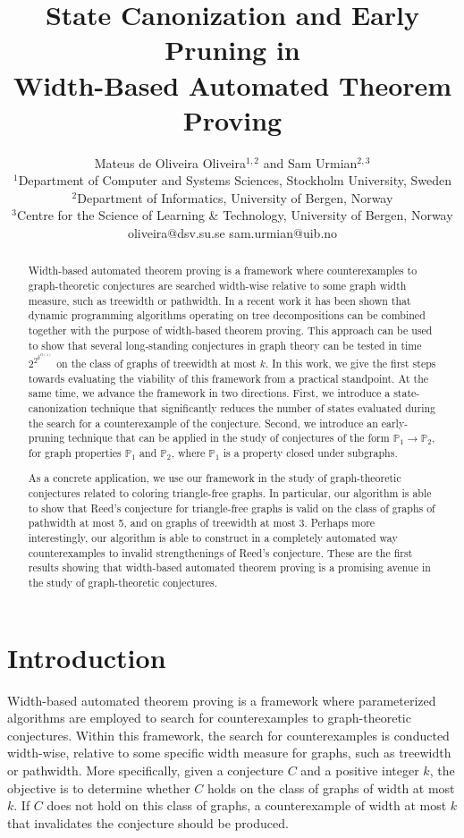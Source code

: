 \documentclass[11pt,a4paper]{article}
\title{State Canonization and Early Pruning in\\Width-Based Automated Theorem Proving}
\author{Mateus de Oliveira Oliveira$^{1,2}$ and Sam Urmian$^{2,3}$ \\
$^1$Department of Computer and Systems Sciences, Stockholm University, Sweden \\
$^2$Department of Informatics, University of Bergen, Norway\\
$^3$Centre for the Science of Learning \& Technology, University of Bergen, Norway\\
oliveira@dsv.su.se \hspace{0.5cm} sam.urmian@uib.no}
\newcommand{\graphproperty}{\mathbb{P}}
\begin{document}
\maketitle


\begin{abstract}
Width-based automated theorem proving is a framework where counterexamples to graph-theoretic conjectures are searched width-wise relative to some graph width measure, such as treewidth or pathwidth.
In a recent work it has been shown that dynamic programming algorithms operating on tree decompositions can be combined together with the purpose of width-based theorem proving. This approach can be used to show that several long-standing conjectures in graph theory can be tested in time $2^{2^{k^{O(1)}}}$ on the class of graphs of treewidth at most $k$. In this work, we give the first steps towards evaluating the viability of this framework from a practical standpoint. At the same time, we advance the framework in two directions.  First, we
introduce a state-canonization technique that significantly reduces the number of states evaluated during the search for a counterexample of the conjecture. Second, we introduce an early-pruning technique that can be applied in the study of conjectures of the form $\graphproperty_1\rightarrow \graphproperty_2$, for graph properties $\graphproperty_1$ and $\graphproperty_2$, where $\graphproperty_1$ is a property closed under subgraphs.

As a concrete application, we use our framework in the study of graph-theoretic conjectures related to coloring triangle-free graphs. In particular, our algorithm is able to show that Reed's conjecture for triangle-free graphs is valid on the class of graphs of pathwidth at most 5, and on graphs of treewidth at most 3. Perhaps more interestingly, our algorithm is able to construct in a completely automated way counterexamples to invalid strengthenings of Reed's conjecture. These are the first results showing that width-based automated theorem proving is a promising avenue in the study of graph-theoretic conjectures.
\end{abstract}

\section{Introduction}

Width-based automated theorem proving is a framework where parameterized algorithms are employed to search for counterexamples to graph-theoretic conjectures.
Within this framework, the search for counterexamples is conducted width-wise, relative to some specific width measure for graphs, such as treewidth or pathwidth. More specifically, given a conjecture $C$ and a positive integer $k$, the objective is to determine whether $C$ holds on the class of graphs of width at most $k$. If $C$ does not hold on this class of graphs, a counterexample of width at most $k$ that invalidates the conjecture should be produced.
\end{document}
